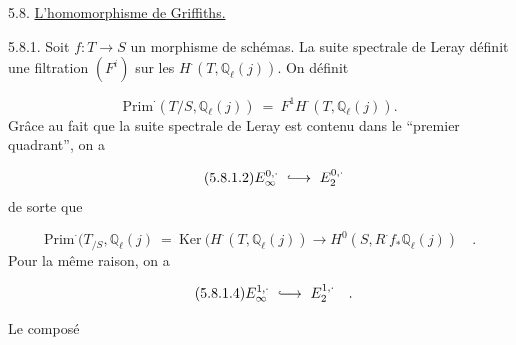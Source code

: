5.8. \underline{L'homomorphisme de Griffiths.}

5.8.1. Soit $f: T \longrightarrow S$ un morphisme de schémas. La suite spectrale de Leray définit une filtration $(F^i)$ sur les $H^{\cdot}(T,\mathbb{Q}_\ell(j))$. On définit

\begin{equation}\tag{5.8.1.1}
\mathrm{Prim}^{\cdot}(T/S,\mathbb{Q}_\ell(j)) \ = \ F^1H^{\cdot}(T,\mathbb{Q}_\ell(j)).
\end{equation}
Grâce au fait que la suite spectrale de Leray est contenu dans le ``premier quadrant'', on a

\begin{equation}\tag{5.8.1.2}
E_\infty^{0,\cdot} \ \lhook\joinrel\longrightarrow \ E_2^{0,\cdot}
\end{equation}
de sorte que

\begin{equation}\tag{5.8.1.3}
\mathrm{Prim}^{\cdot}(T_{/S},\mathbb{Q}_\ell(j) \ = \ \mathrm{Ker} \ (H^{\cdot}(T,\mathbb{Q}_\ell(j)) \longrightarrow H^0(S,R^{\cdot}f_*\mathbb{Q}_\ell(j)) \quad .
\end{equation}
Pour la même raison, on a

\begin{equation}\tag{5.8.1.4}
E_\infty^{1,\cdot} \ \lhook\joinrel\longrightarrow \ E_2^{1,\cdot} \quad .
\end{equation}


%
Le composé

